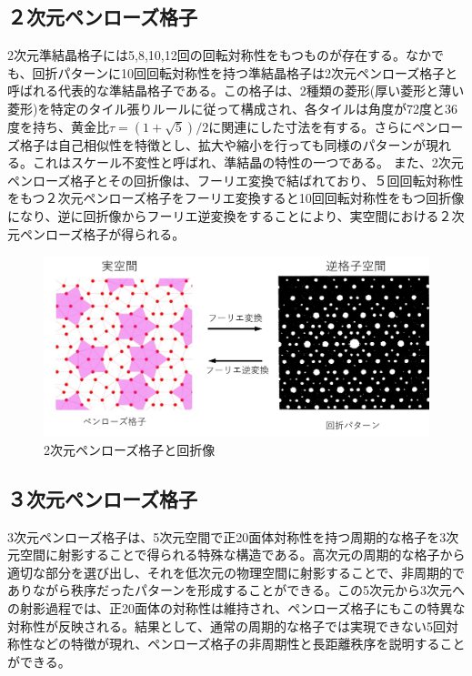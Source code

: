 \documentclass[11pt,a4j]{jreport}
\begin{document}
\subsection{２次元ペンローズ格子}
2次元準結晶格子には5,8,10,12回の回転対称性をもつものが存在する。なかでも、回折パターンに10回回転対称性を持つ準結晶格子は2次元ペンローズ格子と呼ばれる代表的な準結晶格子である。この格子は、2種類の菱形(厚い菱形と薄い菱形)を特定のタイル張りルールに従って構成され、各タイルは角度が72度と36度を持ち、黄金比$\tau=(1+\sqrt{5})/2$に関連にした寸法を有する。さらにペンローズ格子は自己相似性を特徴とし、拡大や縮小を行っても同様のパターンが現れる。これはスケール不変性と呼ばれ、準結晶の特性の一つである。
また、2次元ペンローズ格子とその回折像は、フーリエ変換で結ばれており、５回回転対称性をもつ２次元ペンローズ格子をフーリエ変換すると10回回転対称性をもつ回折像になり、逆に回折像からフーリエ逆変換をすることにより、実空間における２次元ペンローズ格子が得られる。
\begin{figure}[htbp]
  \centering
  \vspace{3mm}
  \includegraphics[width=150mm]{./figure/penrose_tile.png}
  \caption{2次元ペンローズ格子と回折像}
  \label{penrose_tile}
\end{figure}

\subsection{３次元ペンローズ格子}
3次元ペンローズ格子は、5次元空間で正20面体対称性を持つ周期的な格子を3次元空間に射影することで得られる特殊な構造である。高次元の周期的な格子から適切な部分を選び出し、それを低次元の物理空間に射影することで、非周期的でありながら秩序だったパターンを形成することができる。この5次元から3次元への射影過程では、正20面体の対称性は維持され、ペンローズ格子にもこの特異な対称性が反映される。結果として、通常の周期的な格子では実現できない5回対称性などの特徴が現れ、ペンローズ格子の非周期性と長距離秩序を説明することができる。
\end{document}
